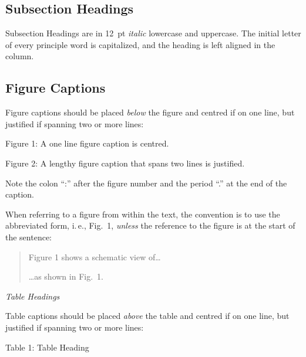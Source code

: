\subsection{Subsection Headings}

Subsection Headings are in \SI{12}{pt} \emph{italic} lowercase and uppercase.
The initial letter of every principle word is capitalized,
and the heading is left aligned in the column.

\subsection{Figure Captions}

Figure captions should be placed \emph{below} the figure and
centred if on one line, but justified if spanning two or
more lines:
\begin{center}
	Figure 1: A one line figure caption is centred.
\end{center}
\begin{justify}
	Figure 2: A lengthy figure caption that spans
	two lines is justified.
\end{justify}

Note the colon “:” after the figure number and the period
“.” at the end of the caption.

When referring to a figure from within the text, the
convention is to use the abbreviated form, i.\,e., Fig.~1,
\emph{unless} the reference to the figure is at the start of the sentence:
\begin{quote}
	Figure 1 shows a schematic view of\ldots
	
	\ldots as shown in Fig.~1.
\end{quote}

\iffalse
\subsection{Table Headings}
\else
\noindent\textit{\vspace{1em}\large Table Headings}
\fi

Table captions should be placed \emph{above} the table and
centred if on one line, but justified if spanning two or
more lines:
\begin{center}
	Table 1: Table Heading
\end{center}

